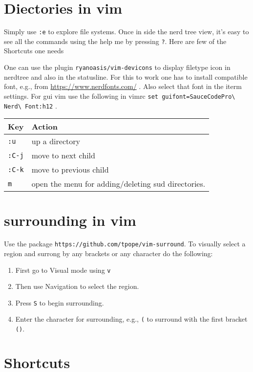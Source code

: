 \documentclass{article}
\begin{document}
\section{Diectories in vim}%
\label{sec:diectories_in_vim}
Simply use \verb!:e! to explore file systems. Once in side the nerd tree view,
it's easy to see all the commands using the help me by pressing \verb!?!. Here
are few of the Shortcuts one needs

One can use the plugin \verb!ryanoasis/vim-devicons! to display filetype icon in
nerdtree and also in the statusline. For this to work one has to install
compatible font, e.g., from \href{https://www.nerdfonts.com/}{https://www.nerdfonts.com/}
. Also select that font in the iterm settings. For gui vim use the following in
vimrc \verb!set guifont=SauceCodePro\ Nerd\ Font:h12!
.

\begin{tabular}{ll}
    \toprule
    Key & Action \\ \midrule
    \verb!:u! & up a directory\\ \midrule
    \verb!:C-j! & move to next child \\ \midrule
    \verb!:C-k! & move to previous child\\ \midrule
    \verb!m! & open the menu for adding/deleting sud directories.\\ \bottomrule
\end{tabular}

\section{surrounding in vim}%
\label{sec:surrounding_in_vim}

Use the package \verb!https://github.com/tpope/vim-surround!. To visually select
a region and surrong by any brackets or any character do the following:

\begin{enumerate}
    \item First go to Visual mode using \verb!v!
    \item Then use Navigation to select the region.
    \item Press \verb!S! to begin surrounding.
    \item Enter the character for surrounding, e.g., \verb!(! to surround with
        the first bracket \verb!()!.
\end{enumerate}

\section{Shortcuts}
\label{sec:shortcuts}
\end{document}

